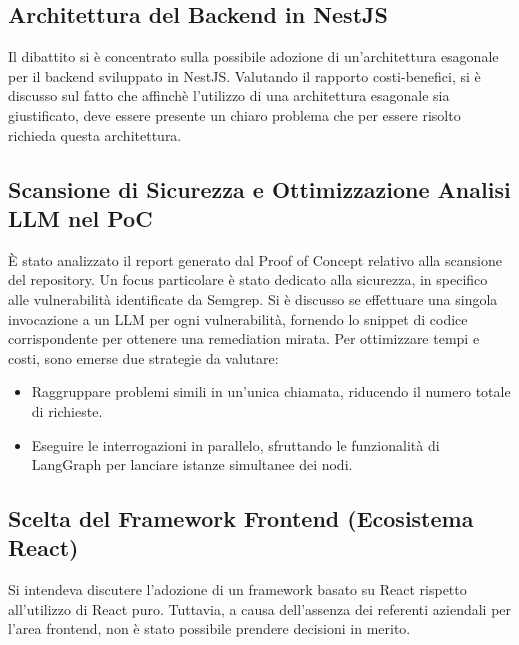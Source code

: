 \documentclass[a4paper, 11pt]{article}
\begin{document}
\subsection{Architettura del Backend in NestJS}
Il dibattito si è concentrato sulla possibile adozione di un'architettura esagonale per il backend sviluppato in NestJS. Valutando il rapporto costi-benefici, si è discusso sul fatto che affinchè l'utilizzo di una architettura esagonale sia giustificato, deve essere presente un chiaro problema che per essere risolto richieda questa architettura.

\subsection{Scansione di Sicurezza e Ottimizzazione Analisi LLM nel PoC}
È stato analizzato il report generato dal Proof of Concept relativo alla scansione del repository. Un focus particolare è stato dedicato alla sicurezza, in specifico alle vulnerabilità identificate da Semgrep. Si è discusso se effettuare una singola invocazione a un LLM per ogni vulnerabilità, fornendo lo snippet di codice corrispondente per ottenere una remediation mirata. Per ottimizzare tempi e costi, sono emerse due strategie da valutare:  
\begin{itemize}
    \item Raggruppare problemi simili in un'unica chiamata, riducendo il numero totale di richieste.
    \item Eseguire le interrogazioni in parallelo, sfruttando le funzionalità di LangGraph per lanciare istanze simultanee dei nodi.
\end{itemize}
\subsection{Scelta del Framework Frontend (Ecosistema React)}
Si intendeva discutere l'adozione di un framework basato su React rispetto all'utilizzo di React puro. Tuttavia, a causa dell'assenza dei referenti aziendali per l'area frontend, non è stato possibile prendere decisioni in merito.



\end{document}
